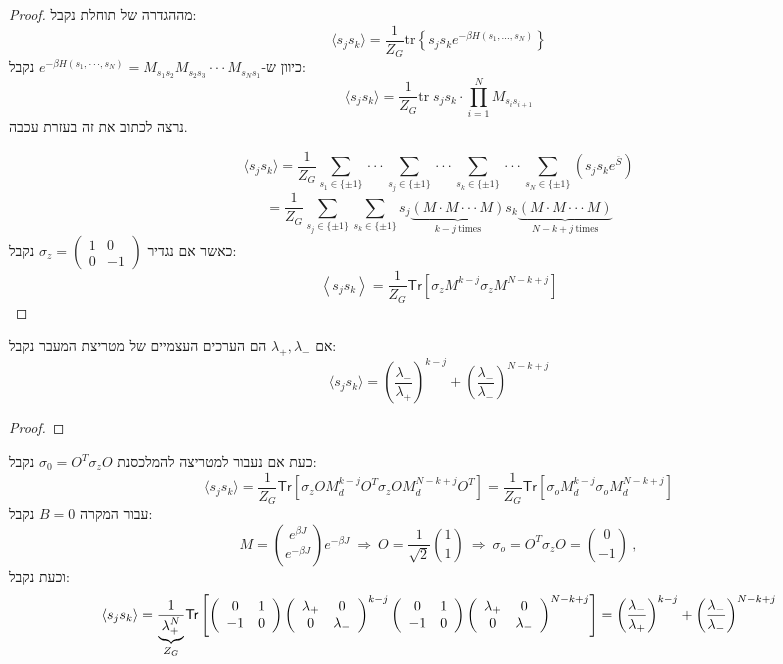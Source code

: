\documentclass{tstextbook}
\begin{document}
\begin{proof}
מההגדרה של תוחלת נקבל:
$$\langle s_{j}s_{k} \rangle =\frac{1}{Z_{G}}\mathrm{tr}\left\{  s_{j}s_{k}e^{ -\beta H\left( s_{1},\dots,s_{N} \right) }  \right\}$$
כיוון ש-\(e^{-\beta H(s_{1},\cdot\cdot\cdot,s_{N})}=M_{s_{1}s_{2}}M_{s_{2}s_{3}}\cdot\cdot\cdot M_{s_{N}s_{1}}\) נקבל:
$$\langle s_{j}s_{k}\rangle=\frac{1}{Z_{G}}\mathrm{tr}\;s_{j}s_{k}\cdot\prod_{i=1}^{N}{ M}_{s_{i}s_{i+1}}$$
נרצה לכתוב את זה בעזרת עכבה. 

$$\langle s_{j}s_{k}\rangle=\frac{1}{Z_{G}}\sum_{s_{1}\in\{\pm1\}}\cdot\cdot\cdot\sum_{s_{j}\in\{\pm1\}}\cdot\cdot\cdot\sum_{s_{k}\in\{\pm1\}}\cdot\cdot\cdot\sum_{s_{N}\in\{\pm1\}}\left(s_{j}s_{k}e^{\overline{{S}}}\right)$$$$=\frac{1}{Z_{G}}\sum_{s_{j}\in\{\pm1\}}\sum_{s_{k}\in\{\pm1\}}s_{j}\underbrace{(M\cdot M\cdot\cdot\cdot M)}_{k-j\ \mathrm{times}}s_{k}\underbrace{(M\cdot M\cdot\cdot\cdot M)}_{N-k+j\ \mathrm{times}}$$
כאשר אם נגדיר \(\sigma_{z}=\begin{pmatrix}1 & 0 \\ 0 & -1\end{pmatrix}\) נקבל:
$$\left\langle s_{j}s_{k}\right\rangle=\frac1{Z_{G}}{\mathsf{T r}}\left[\sigma_{z}M^{k-j}\sigma_{z}M^{N-k+j}\right]$$

\end{proof}
\begin{corollary}
אם \(\lambda_{+},\lambda_{-}\) הם הערכים העצמיים של מטריצת המעבר נקבל:
$$\langle s_{j}s_{k} \rangle = \left(\frac{\lambda_{-}}{\lambda_{+}}\right)^{k-j}+\left(\frac{\lambda_{-}}{\lambda_{-}}\right)^{N-k+j}$$

\end{corollary}
\begin{proof}
\end{proof}
כעת אם נעבור למטריצה להמלכסנת \(\sigma_{0}=O^{T}\sigma _zO\) נקבל:
$$\langle s_{j}s_{k}\rangle=\frac{1}{Z_{G}}{\mathsf{T r}}\left[\sigma_{z}O M_{d}^{k-j}O^{T}\sigma_{z}O M_{d}^{N-k+j}O^{T}\right]=\frac{1}{Z_{G}}{\mathsf{T r}}\left[\sigma_{o}M_{d}^{k-j}\sigma_{o}M_{d}^{N-k+j}\right]$$
עבור המקרה \(B=0\) נקבל:
$$M={\binom{e^{\beta J}}{e^{-\beta J}}}{e^{-\beta J}}~\Rightarrow~O={\frac{1}{\sqrt{2}}}{\binom{1}{1}}~\Rightarrow~\sigma_{o}=O^{T}\sigma_{z}O={\binom{0}{-1}}~,$$
וכעת נקבל:
$$\langle s_{j}s_{k}\rangle=\frac{1}{\underbrace{\lambda_{+}^{N}}_{Z_{G}}}{\sf T r}\left[\left( \begin{array}{c c c}{{0}}&{{1}}\\ {{-1}}&{{0}}\end{array} \right)\left( \begin{array}{c c c}{{\lambda_{+}}}&{{0}}\\ {{0}}&{{\lambda_{-}}}\end{array} \right)^{k-j}\left( \begin{array}{c c c}{{0}}&{{1}}\\ {{-1}}&{{0}}\end{array} \right)\left( \begin{array}{c c c}{{\lambda_{+}}}&{{0}}\\ {{0}}&{{\lambda_{-}}}\end{array} \right)^{N-k+j}\right]=\left(\frac{\lambda_{-}}{\lambda_{+}}\right)^{k-j}+\left(\frac{\lambda_{-}}{\lambda_{-}}\right)^{N-k+j}$$
\end{document}
